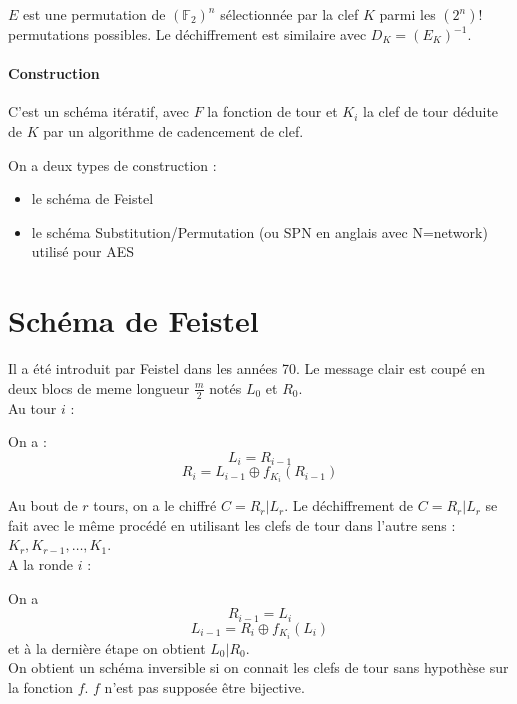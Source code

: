 \documentclass[12pt,a4paper]{report}
\begin{document}
$E$ est une permutation de $(\mathbb{F}_2)^n$ sélectionnée par la clef $K$ parmi les $(2^n)$! permutations possibles.
Le déchiffrement est similaire avec $D_K = (E_K)^{-1}$.
\begin{center}
  \scalebox{0.6}{}	
\end{center}

\paragraph{Construction\\}
C'est un schéma itératif, avec $F$ la fonction de tour et $K_i$ la clef de tour déduite de $K$ par un algorithme de cadencement de clef.
\begin{center}
  \scalebox{0.6}{}	
\end{center}

On a deux types de construction :
\begin{itemize}
\item le schéma de Feistel
\item le schéma Substitution/Permutation (ou SPN en anglais avec N=network) utilisé pour AES
\end{itemize}
\section{Schéma de Feistel}
Il a été introduit par Feistel dans les années 70. Le message clair est coupé en deux blocs de meme longueur $\frac{m}{2}$ notés $L_0$ et $R_0$.\\
Au tour $i$ :
\begin{center}
  \scalebox{0.6}{}	
\end{center}

On a : 
$$ L_i = R_{i-1}$$
$$ R_i = L_{i-1} \oplus f_{K_i} (R_{i-1}) $$

Au bout de $r$ tours, on a le chiffré $C=R_r | L_r $. Le déchiffrement de $C=R_r | L_r $ se fait avec le même procédé en utilisant les clefs de tour dans l'autre sens : $K_r,K_{r-1},\ldots,K_1$.\\
A la ronde $i$ :
\begin{center}
  \scalebox{0.6}{}	
\end{center}

On a 
$$ R_{i-1} = L_i $$
$$ L_{i-1} = R_i \oplus f_{K_i}(L_i) $$
et à la dernière étape on obtient $L_0 | R_0$. \\
On obtient un schéma inversible si on connait les clefs de tour sans hypothèse sur la fonction $f$. $f$ n'est pas supposée être bijective.
\end{document}

